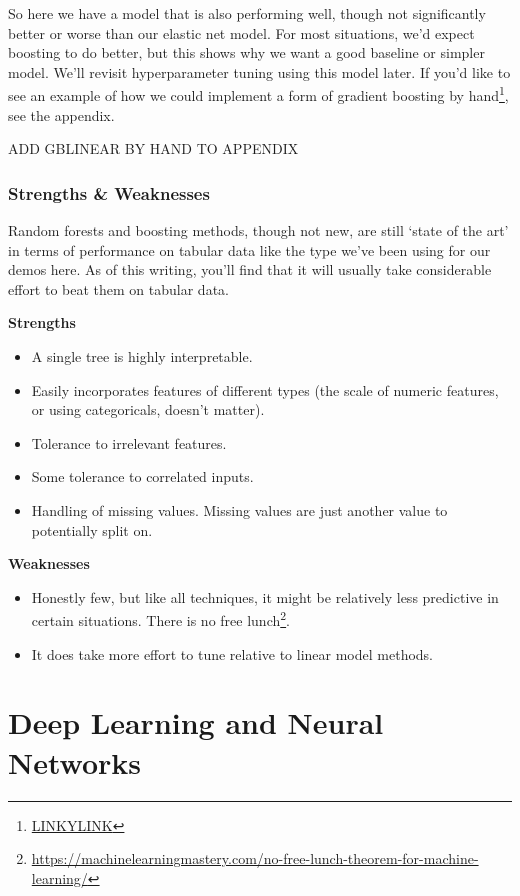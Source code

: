 \documentclass[
  letterpaper,
]{krantz}
\providecommand{\tightlist}{%
  \setlength{\itemsep}{0pt}\setlength{\parskip}{0pt}}\usepackage{longtable,booktabs,array}
\DeclareRobustCommand{\href}[2]{#2\footnote{\url{#1}}}
\begin{document}
So here we have a model that is also performing well, though not
significantly better or worse than our elastic net model. For most
situations, we'd expect boosting to do better, but this shows why we
want a good baseline or simpler model. We'll revisit hyperparameter
tuning using this model later. If you'd like to see an example of how we
could implement a form of \href{LINKYLINK}{gradient boosting by hand},
see the appendix.

ADD GBLINEAR BY HAND TO APPENDIX

\subsubsection{Strengths \& Weaknesses}\label{strengths-weaknesses-1}

Random forests and boosting methods, though not new, are still `state of
the art' in terms of performance on tabular data like the type we've
been using for our demos here. As of this writing, you'll find that it
will usually take considerable effort to beat them on tabular data.

\textbf{Strengths}

\begin{itemize}
\tightlist
\item
  A single tree is highly interpretable.
\item
  Easily incorporates features of different types (the scale of numeric
  features, or using categoricals, doesn't matter).
\item
  Tolerance to irrelevant features.
\item
  Some tolerance to correlated inputs.
\item
  Handling of missing values. Missing values are just another value to
  potentially split on.
\end{itemize}

\textbf{Weaknesses}

\begin{itemize}
\tightlist
\item
  Honestly few, but like all techniques, it might be relatively less
  predictive in certain situations. There is
  \href{https://machinelearningmastery.com/no-free-lunch-theorem-for-machine-learning/}{no
  free lunch}.
\item
  It does take more effort to tune relative to linear model methods.
\end{itemize}

\section{Deep Learning and Neural
Networks}\label{deep-learning-and-neural-networks}
\end{document}
